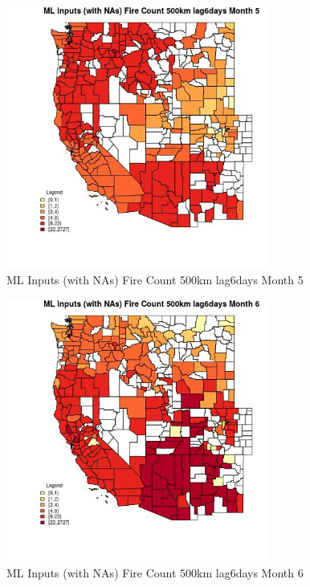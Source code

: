 \begin{figure} 
\centering  
\includegraphics[width=0.77\textwidth]{Code_Outputs/Report_ML_input_PM25_Step4_part_f_de_duplicated_aves_prioritize_24hr_obswNAs_CountyFire_Count_500km_lag6daysmedianMonth5.jpg} 
\caption{\label{fig:Report_ML_input_PM25_Step4_part_f_de_duplicated_aves_prioritize_24hr_obswNAsCountyFire_Count_500km_lag6daysmedianMonth5}ML Inputs (with NAs) Fire Count 500km lag6days Month 5} 
\end{figure} 
 

\begin{figure} 
\centering  
\includegraphics[width=0.77\textwidth]{Code_Outputs/Report_ML_input_PM25_Step4_part_f_de_duplicated_aves_prioritize_24hr_obswNAs_CountyFire_Count_500km_lag6daysmedianMonth6.jpg} 
\caption{\label{fig:Report_ML_input_PM25_Step4_part_f_de_duplicated_aves_prioritize_24hr_obswNAsCountyFire_Count_500km_lag6daysmedianMonth6}ML Inputs (with NAs) Fire Count 500km lag6days Month 6} 
\end{figure} 
 


